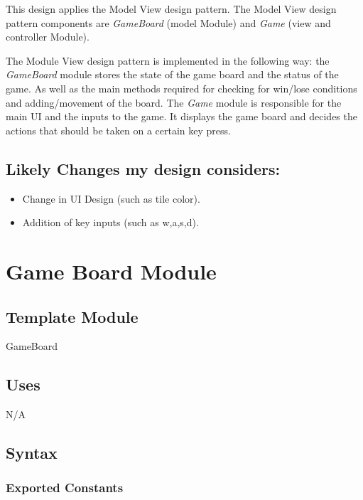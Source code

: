 \documentclass[12pt]{article}
\begin{document}
This design applies the Model View design pattern. The Model View design
pattern components are \textit{GameBoard} (model Module) and \textit{Game}
(view and controller Module).


\medskip
The Module View design pattern is implemented in the following way: the
\textit{GameBoard} module stores the state of the game board and the status
of the game. As well as the main methods required for checking for win/lose
conditions and adding/movement of the board. The \textit{Game} module is
responsible for the main UI and the inputs to the game. It displays the
game board and decides the actions that should be taken on a certain key press. 

\newpage

\subsection*{Likely Changes my design considers:}

\begin{itemize}
  \item Change in UI Design (such as tile color).
  \item Addition of key inputs (such as w,a,s,d).
\end{itemize}

\newpage

\section*{Game Board Module}

\subsection*{Template Module}

GameBoard 

\subsection*{Uses}

N/A

\subsection* {Syntax}

\subsubsection* {Exported Constants}
\end{document}
